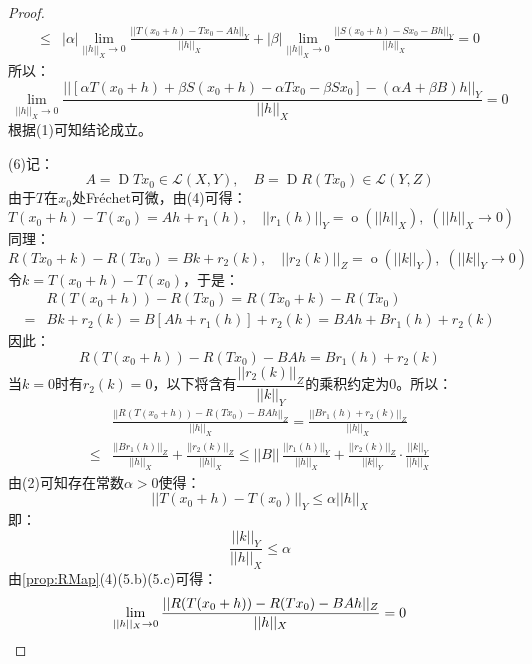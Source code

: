 \begin{proof}
\begin{align*}
		\leqslant&|\alpha|\lim_{||h||_X\to0}\frac{||T(x_0+h)-Tx_0-Ah||_Y}{||h||_X}+|\beta|\lim_{||h||_X\to0}\frac{||S(x_0+h)-Sx_0-Bh||_Y}{||h||_X}=0
	\end{align*}
	所以：
	\begin{equation*}
		\lim_{||h||_X\to0}\frac{||[\alpha T(x_0+h)+\beta S(x_0+h)-\alpha Tx_0-\beta Sx_0]-(\alpha A+\beta B)h||_Y}{||h||_X}=0
	\end{equation*}
	根据(1)可知结论成立。\par
	(6)记：
	\begin{equation*}
		A=\operatorname{D}Tx_0\in\mathcal{L}(X,Y),\quad B=\operatorname{D}R(Tx_0)\in\mathcal{L}(Y,Z)
	\end{equation*}
	由于$T$在$x_0$处Fr\'echet可微，由(4)可得：
	\begin{equation*}
		T(x_0+h)-T(x_0)=Ah+r_1(h),\quad||r_1(h)||_Y=\operatorname{o}(||h||_X),\;(||h||_X\to0)
	\end{equation*}
	同理：
	\begin{equation*}
		R(Tx_0+k)-R(Tx_0)=Bk+r_2(k),\quad||r_2(k)||_Z=\operatorname{o}(||k||_Y),\;(||k||_Y\to0)
	\end{equation*}
	令$k=T(x_0+h)-T(x_0)$，于是：
	\begin{align*}
		&R(T(x_0+h))-R(Tx_0)=R(Tx_0+k)-R(Tx_0)\\
		=&Bk+r_2(k)=B[Ah+r_1(h)]+r_2(k)=BAh+Br_1(h)+r_2(k)
	\end{align*}
	因此：
	\begin{equation*}
		R(T(x_0+h))-R(Tx_0)-BAh=Br_1(h)+r_2(k)
	\end{equation*}
	当$k=0$时有$r_2(k)=0$，以下将含有$\dfrac{||r_2(k)||_Z}{||k||_Y}$的乘积约定为$0$。所以：
	\begin{align*}
		&\frac{||R(T(x_0+h))-R(Tx_0)-BAh||_Z}{||h||_X}=\frac{||Br_1(h)+r_2(k)||_Z}{||h||_X} \\
		\leqslant&\frac{||Br_1(h)||_Z}{||h||_X}+\frac{||r_2(k)||_Z}{||h||_X}\leqslant
		||B||\,\frac{||r_1(h)||_Y}{||h||_X}+\frac{||r_2(k)||_Z}{||k||_Y}\cdot\frac{||k||_Y}{||h||_X}
	\end{align*}
	由(2)可知存在常数$\alpha>0$使得：
	\begin{equation*}
		||T(x_0+h)-T(x_0)||_Y\leqslant\alpha||h||_X
	\end{equation*}
	即：
	\begin{equation*}
		\frac{||k||_Y}{||h||_X}\leqslant\alpha
	\end{equation*}
	由\cref{prop:RMap}(4)(5.b)(5.c)可得：
	\begin{equation*}
		\lim_{||h||_X\to0}\frac{||R(T(x_0+h))-R(Tx_0)-BAh||_Z}{||h||_X}=0\qedhere
	\end{equation*}
\end{proof}
